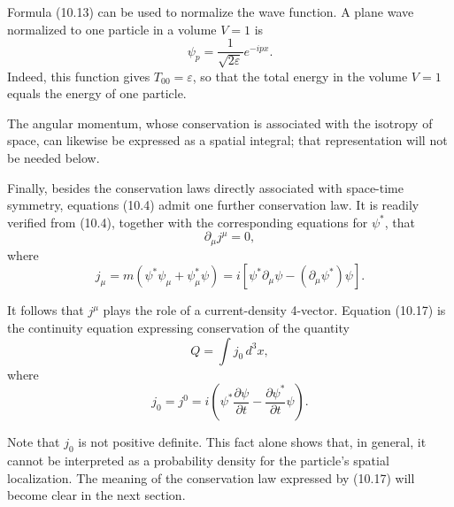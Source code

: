 Formula (10.13) can be used to normalize the wave function. A plane wave normalized to one particle in a volume $V=1$ is
\begin{equation}
\psi_p=\frac{1}{\sqrt{2\varepsilon}}e^{-ipx}.
\tag{10.16}
\end{equation}
Indeed, this function gives $T_{00}=\varepsilon$, so that the total energy in the volume $V=1$ equals the energy of one particle.

The angular momentum, whose conservation is associated with the isotropy of space, can likewise be expressed as a spatial integral; that representation will not be needed below.

Finally, besides the conservation laws directly associated with space-time symmetry, equations (10.4) admit one further conservation law. It is readily verified from (10.4), together with the corresponding equations for $\psi^*$, that
\begin{equation}
\partial_\mu j^\mu=0,
\tag{10.17}
\end{equation}
where
\begin{equation}
j_\mu=m(\psi^*\psi_\mu+\psi^*_\mu\psi)
=i[\psi^*\partial_\mu\psi-(\partial_\mu\psi^*)\psi].
\tag{10.18}
\end{equation}

It follows that $j^\mu$ plays the role of a current-density 4-vector. Equation (10.17) is the continuity equation expressing conservation of the quantity
\begin{equation}
Q=\int j_0\,d^3x,
\tag{10.19}
\end{equation}
where
\begin{equation}
j_0=j^0=i\left(\psi^*\frac{\partial\psi}{\partial t}
-\frac{\partial\psi^*}{\partial t}\psi\right).
\tag{10.20}
\end{equation}

Note that $j_0$ is not positive definite. This fact alone shows that, in general, it cannot be interpreted as a probability density for the particle's spatial localization. The meaning of the conservation law expressed by (10.17) will become clear in the next section.
